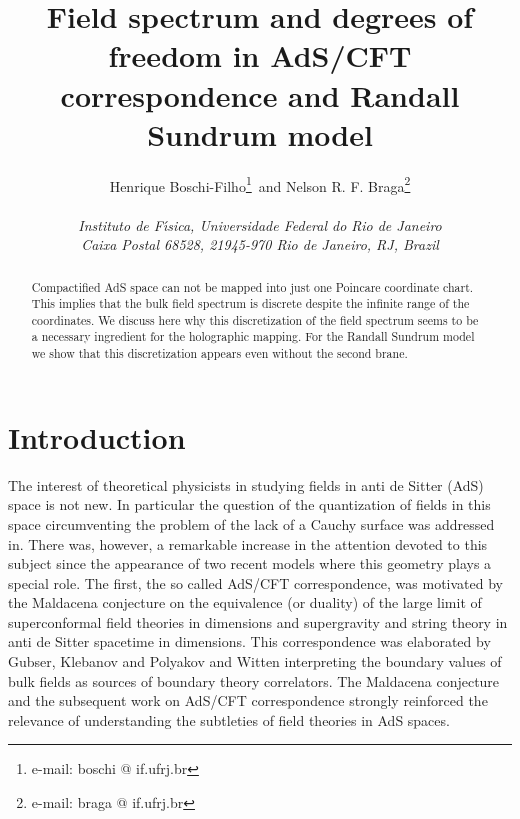 \documentclass[a4paper,12pt]{article}
\begin{document}
\baselineskip=20pt

\title{Field spectrum and degrees of freedom in  AdS/CFT correspondence
and Randall Sundrum model}


\author{\large Henrique Boschi-Filho\footnote{\noindent e-mail: 
boschi @ if.ufrj.br}\,  
and 
Nelson R. F. Braga\footnote{\noindent e-mail: braga @ if.ufrj.br}
\\ 
\\ 
\it Instituto de F\'\i sica, Universidade Federal do Rio de Janeiro\\
\it Caixa Postal 68528, 21945-970  Rio de Janeiro, RJ, Brazil}
 
\date{}

\maketitle

\vskip 3cm


\begin{abstract}  
Compactified AdS space can not be mapped into just one Poincare 
coordinate chart. This implies that the  bulk field spectrum 
is discrete despite the infinite range of the  coordinates.
We discuss here why this discretization of the field spectrum 
seems to be a necessary  ingredient for the holographic mapping.
For the Randall Sundrum model we show that this discretization 
appears even without the second brane. 

\end{abstract}



\vfill\eject

\section{Introduction}

The interest of theoretical physicists in studying fields in
anti de Sitter (AdS) space is not new\cite{Fro}.
In particular the question of the quantization of fields in this space
circumventing the problem of the lack of a Cauchy surface
was addressed in\cite{QAdS1,QAdS2}. 
There was, however, a remarkable increase in the attention devoted
to this subject since the appearance of  two recent models where this 
geometry plays a special role.
The first, the so called AdS/CFT correspondence,  was motivated 
by the Maldacena \cite{Malda} conjecture on the equivalence 
(or duality) of the large \coordHE{} limit of \coordHE{} superconformal 
field theories in \coordHE{} dimensions and supergravity and 
string theory in anti de Sitter spacetime in \coordHE{}  dimensions. 
This correspondence was elaborated by  
Gubser, Klebanov and Polyakov \cite{GKP} and  Witten \cite{Wi}
interpreting the boundary values of bulk fields as sources of 
boundary theory correlators.
The Maldacena conjecture and the subsequent 
work on AdS/CFT correspondence\cite{Malda2}  strongly reinforced the
relevance of understanding  the subtleties of field theories in 
AdS spaces. 
\end{document}

